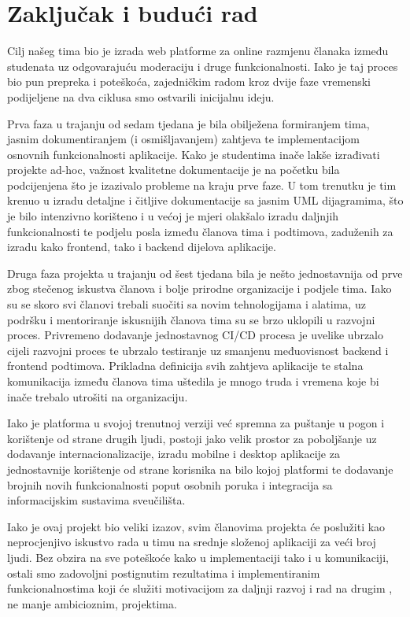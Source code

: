 \chapter{Zaključak i budući rad}

Cilj našeg tima bio je izrada web platforme za online razmjenu članaka između 
studenata uz odgovarajuću moderaciju i druge funkcionalnosti. Iako je taj 
proces bio pun prepreka i poteškoća, zajedničkim radom kroz dvije faze 
vremenski podijeljene na dva ciklusa smo ostvarili inicijalnu 
ideju.

Prva faza u trajanju od sedam tjedana je bila obilježena formiranjem tima, 
jasnim dokumentiranjem (i osmišljavanjem) zahtjeva te implementacijom osnovnih 
funkcionalnosti aplikacije. Kako je studentima inače lakše izrađivati projekte 
ad-hoc, važnost kvalitetne dokumentacije je na početku bila podcijenjena što 
je izazivalo probleme na kraju prve faze. U tom trenutku je tim krenuo u 
izradu detaljne i čitljive dokumentacije sa jasnim UML dijagramima, što je 
bilo intenzivno korišteno i u većoj je mjeri olakšalo izradu daljnjih 
funkcionalnosti te podjelu posla između članova tima i podtimova, zaduženih za 
izradu kako frontend, tako i backend dijelova aplikacije.

Druga faza projekta u trajanju od šest tjedana bila je nešto jednostavnija od 
prve zbog stečenog iskustva članova i bolje prirodne organizacije i podjele 
tima. Iako su se skoro svi članovi trebali suočiti sa novim tehnologijama i 
alatima, uz podršku i mentoriranje iskusnijih članova tima su se brzo uklopili 
u razvojni proces. Privremeno dodavanje jednostavnog CI/CD procesa je uvelike 
ubrzalo cijeli razvojni proces te ubrzalo testiranje uz smanjenu međuovisnost 
backend i frontend podtimova. Prikladna definicija svih zahtjeva aplikacije te 
stalna komunikacija između članova tima uštedila je mnogo truda i vremena koje 
bi inače trebalo utrošiti na organizaciju.

Iako je platforma u svojoj trenutnoj verziji već spremna za puštanje u pogon i 
korištenje od strane drugih ljudi, postoji jako velik prostor za poboljšanje 
uz dodavanje internacionalizacije, izradu mobilne i desktop aplikacije za 
jednostavnije korištenje od strane korisnika na bilo kojoj platformi te 
dodavanje brojnih novih funkcionalnosti poput osobnih poruka i integracija sa 
informacijskim sustavima sveučilišta.

Iako je ovaj projekt bio veliki izazov, svim članovima projekta će poslužiti 
kao neprocjenjivo iskustvo rada u timu na srednje složenoj aplikaciji za veći 
broj ljudi. Bez obzira na sve poteškoće kako u implementaciji tako i u 
komunikaciji, ostali smo zadovoljni postignutim rezultatima i implementiranim 
funkcionalnostima koji će služiti motivacijom za daljnji razvoj i rad na drugim
, ne manje ambicioznim, projektima.
		
\eject 
